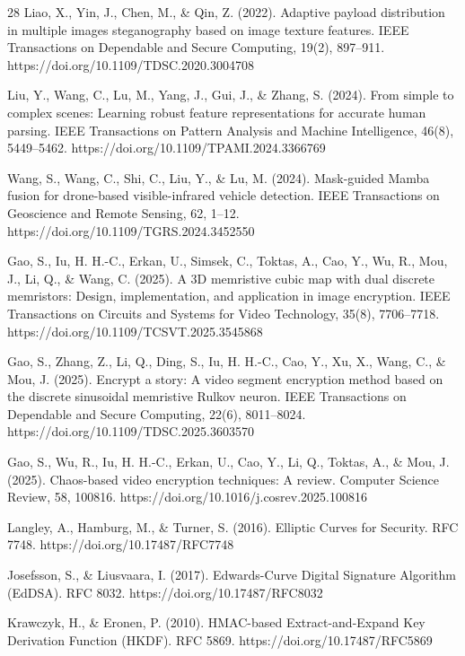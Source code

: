 \documentclass[preprint,12pt]{elsarticle}
\theoremstyle{plain}
\begin{document}
\begin{thebibliography}{28}
Liao, X., Yin, J., Chen, M., \& Qin, Z. (2022). Adaptive payload distribution in multiple images steganography based on image texture features. IEEE Transactions on Dependable and Secure Computing, 19(2), 897--911. https://doi.org/10.1109/TDSC.2020.3004708

Liu, Y., Wang, C., Lu, M., Yang, J., Gui, J., \& Zhang, S. (2024). From simple to complex scenes: Learning robust feature representations for accurate human parsing. IEEE Transactions on Pattern Analysis and Machine Intelligence, 46(8), 5449--5462. https://doi.org/10.1109/TPAMI.2024.3366769

Wang, S., Wang, C., Shi, C., Liu, Y., \& Lu, M. (2024). Mask-guided Mamba fusion for drone-based visible-infrared vehicle detection. IEEE Transactions on Geoscience and Remote Sensing, 62, 1--12. https://doi.org/10.1109/TGRS.2024.3452550

Gao, S., Iu, H. H.-C., Erkan, U., Simsek, C., Toktas, A., Cao, Y., Wu, R., Mou, J., Li, Q., \& Wang, C. (2025). A 3D memristive cubic map with dual discrete memristors: Design, implementation, and application in image encryption. IEEE Transactions on Circuits and Systems for Video Technology, 35(8), 7706--7718. https://doi.org/10.1109/TCSVT.2025.3545868

Gao, S., Zhang, Z., Li, Q., Ding, S., Iu, H. H.-C., Cao, Y., Xu, X., Wang, C., \& Mou, J. (2025). Encrypt a story: A video segment encryption method based on the discrete sinusoidal memristive Rulkov neuron. IEEE Transactions on Dependable and Secure Computing, 22(6), 8011--8024. https://doi.org/10.1109/TDSC.2025.3603570

Gao, S., Wu, R., Iu, H. H.-C., Erkan, U., Cao, Y., Li, Q., Toktas, A., \& Mou, J. (2025). Chaos-based video encryption techniques: A review. Computer Science Review, 58, 100816. https://doi.org/10.1016/j.cosrev.2025.100816

Langley, A., Hamburg, M., \& Turner, S. (2016). Elliptic Curves for Security. RFC 7748. https://doi.org/10.17487/RFC7748

Josefsson, S., \& Liusvaara, I. (2017). Edwards-Curve Digital Signature Algorithm (EdDSA). RFC 8032. https://doi.org/10.17487/RFC8032

Krawczyk, H., \& Eronen, P. (2010). HMAC-based Extract-and-Expand Key Derivation Function (HKDF). RFC 5869. https://doi.org/10.17487/RFC5869


\end{thebibliography}
\end{document}
